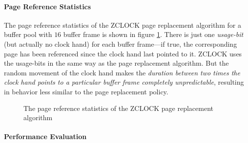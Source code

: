 \paragraph{Page Reference Statistics}

    The page reference statistics of the ZCLOCK page replacement algorithm for a buffer pool with $16$ buffer frame is shown in figure \ref{fig:zclock}. There is just one \emph{usage-bit} (but actually no clock hand) for each buffer frame---if true, the corresponding page has been referenced since the clock hand last pointed to it. ZCLOCK uses the usage-bits in the same way as the  page replacement algorithm. But the random movement of the clock hand makes the \emph{duration between two times the clock hand points to a particular buffer frame completely unpredictable}, resulting in behavior less similar to the  page replacement policy.

\begin{@empty}
    
    \begin{figure}[h]
        \centering
        \vspace{-.5em}
        \caption[Page reference statistics of ZCLOCK]{The page reference statistics of the ZCLOCK page replacement algorithm}
        \label{fig:zclock}
    \end{figure}
\end{@empty}

\paragraph{Performance Evaluation}

